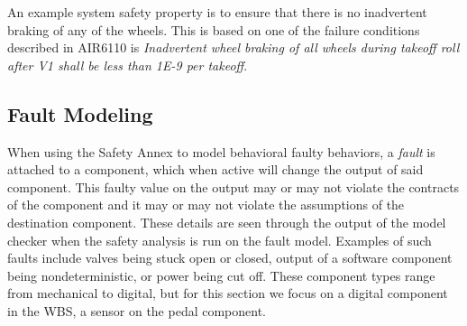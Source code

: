 An example system safety property is to ensure that there is no inadvertent braking of any of the wheels. This is based on one of the failure conditions described in AIR6110 is \textit{Inadvertent wheel braking of all wheels during takeoff roll after V1 shall be less than 1E-9 per takeoff}. 



\subsection{Fault Modeling}

When using the Safety Annex to model behavioral faulty behaviors, %
a \textit{fault} is attached to a component, which when active will change the output of said component. This faulty value on the output may or may not violate the contracts of the component and it may or may not violate the assumptions of the destination component. These details are seen through the output of the model checker when the safety analysis is run on the fault model. Examples of such faults include valves being stuck open or closed, output of a software component being nondeterministic, or power being cut off. These component types range from mechanical to digital, but for this section we focus on a digital component in the WBS, a sensor on the pedal component. 

